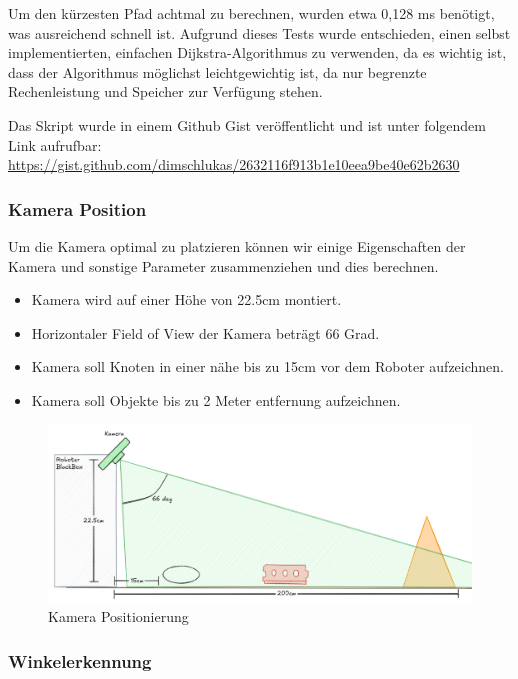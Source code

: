 Um den kürzesten Pfad achtmal zu berechnen, wurden etwa 0,128 ms benötigt, was ausreichend schnell ist. Aufgrund dieses Tests wurde entschieden, einen selbst implementierten, einfachen Dijkstra-Algorithmus zu verwenden, da es wichtig ist, dass der Algorithmus möglichst leichtgewichtig ist, da nur begrenzte Rechenleistung und Speicher zur Verfügung stehen.

Das Skript wurde in einem Github Gist veröffentlicht und ist unter folgendem Link aufrufbar: \url{https://gist.github.com/dimschlukas/2632116f913b1e10eea9be40e62b2630}

\subsubsection{Kamera Position}\label{camera-position}

Um die Kamera optimal zu platzieren können wir einige Eigenschaften der Kamera und sonstige Parameter zusammenziehen und dies berechnen.

\begin{itemize}
    \item Kamera wird auf einer Höhe von 22.5cm montiert.
    \item Horizontaler Field of View der Kamera beträgt 66 Grad.
    \item Kamera soll Knoten in einer nähe bis zu 15cm vor dem Roboter aufzeichnen.
    \item Kamera soll Objekte bis zu 2 Meter entfernung aufzeichnen.
\end{itemize}

\begin{figure}
    \centering
    \includegraphics[width=1\linewidth]{assets//informatik-prototyp//camera/camera_position.png}
    \caption{Kamera Positionierung}
    \label{fig:camera-position}
\end{figure}


\subsubsection{Winkelerkennung}\label{winkelerkennung}


